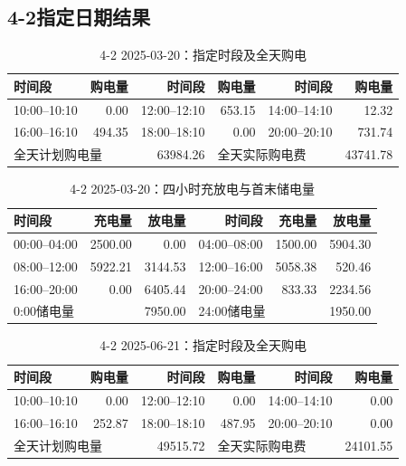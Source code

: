 \FloatBarrier
\subsection{4-2指定日期结果}
\begin{table}[htbp]\centering\scriptsize
\caption{4-2 2025-03-20：指定时段及全天购电}
\begin{tabular}{lrrrrr}\toprule
时间段 & 购电量 & 时间段 & 购电量 & 时间段 & 购电量\\\midrule
10:00--10:10 & 0.00 & 12:00--12:10 & 653.15 & 14:00--14:10 & 12.32\\
16:00--16:10 & 494.35 & 18:00--18:10 & 0.00 & 20:00--20:10 & 731.74\\
\multicolumn{2}{l}{全天计划购电量} & 63984.26 & \multicolumn{2}{l}{全天实际购电费} & 43741.78\\
\bottomrule\end{tabular}\end{table}

\begin{table}[htbp]\centering\scriptsize
\caption{4-2 2025-03-20：四小时充放电与首末储电量}
\begin{tabular}{lrrrrr}\toprule
时间段 & 充电量 & 放电量 & 时间段 & 充电量 & 放电量\\\midrule
00:00--04:00 & 2500.00 & 0.00 & 04:00--08:00 & 1500.00 & 5904.30\\
08:00--12:00 & 5922.21 & 3144.53 & 12:00--16:00 & 5058.38 & 520.46\\
16:00--20:00 & 0.00 & 6405.44 & 20:00--24:00 & 833.33 & 2234.56\\
\multicolumn{2}{l}{0:00储电量} & 7950.00 & \multicolumn{2}{l}{24:00储电量} & 1950.00\\
\bottomrule\end{tabular}\end{table}

\FloatBarrier
\begin{table}[htbp]\centering\scriptsize
\caption{4-2 2025-06-21：指定时段及全天购电}
\begin{tabular}{lrrrrr}\toprule
时间段 & 购电量 & 时间段 & 购电量 & 时间段 & 购电量\\\midrule
10:00--10:10 & 0.00 & 12:00--12:10 & 0.00 & 14:00--14:10 & 0.00\\
16:00--16:10 & 252.87 & 18:00--18:10 & 487.95 & 20:00--20:10 & 0.00\\
\multicolumn{2}{l}{全天计划购电量} & 49515.72 & \multicolumn{2}{l}{全天实际购电费} & 24101.55\\
\bottomrule\end{tabular}\end{table}

